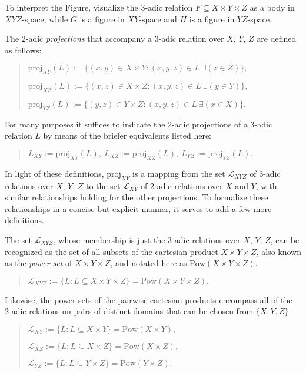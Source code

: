 \documentclass[12pt]{article}
\begin{document}
To interpret the Figure, visualize the 3-adic relation $F \subseteq X \times Y \times Z$ as a body in $XYZ$-space, while $G$ is a figure in $XY$-space and $H$ is a figure in $YZ$-space.

The 2-adic \textit{projections} that accompany a 3-adic relation over $X$, $Y$, $Z$ are defined as follows:

\begin{quote}
$\mathrm{proj}_{XY}(L) := \{ (x, y) \in X \times Y : (x, y, z) \in L\ \exists (z \in Z)\},$

$\mathrm{proj}_{XZ}(L) := \{ (x, z) \in X \times Z : (x, y, z) \in L\ \exists (y \in Y) \},$

$\mathrm{proj}_{YZ}(L) := \{ (y, z) \in Y \times Z : (x, y, z) \in L\ \exists (x \in X)\}.$
\end{quote}

For many purposes it suffices to indicate the 2-adic projections of a 3-adic relation $L$ by means of the briefer equivalents listed here:

\begin{quote}
$L_{XY} := \mathrm{proj}_{XY}(L),\ L_{XZ} := \mathrm{proj}_{XZ}(L),\ L_{YZ} := \mathrm{proj}_{YZ}(L).$
\end{quote}

In light of these definitions, $\mathrm{proj}_{XY}$ is a mapping from the set $\mathcal{L}_{XYZ}$ of 3-adic relations over $X$, $Y$, $Z$ to the set $\mathcal{L}_{XY}$ of 2-adic relations over $X$ and $Y$, with similar relationships holding for the other projections.  To formalize these relationships in a concise but explicit manner, it serves to add a few more definitions.

The set $\mathcal{L}_{XYZ}$, whose membership is just the 3-adic relations over $X$, $Y$, $Z$, can be recognized as the set of all subsets of the cartesian product $X \times Y \times Z$, also known as the \textit{power set} of $X \times Y \times Z$, and notated here as $\mathrm{Pow}(X \times Y \times Z)$.

\begin{quote}
$\mathcal{L}_{XYZ} := \{ L : L \subseteq X \times Y \times Z \} = \mathrm{Pow}(X \times Y \times Z).$
\end{quote}

Likewise, the power sets of the pairwise cartesian products encompass all of the 2-adic relations on pairs of distinct domains that can be chosen from $\{ X, Y, Z \}$.

\begin{quote}
$\mathcal{L}_{XY} := \{ L : L \subseteq X \times Y \} = \mathrm{Pow}(X \times Y),$

$\mathcal{L}_{XZ} := \{ L : L \subseteq X \times Z \} = \mathrm{Pow}(X \times Z),$

$\mathcal{L}_{YZ} := \{ L : L \subseteq Y \times Z \} = \mathrm{Pow}(Y \times Z).$
\end{quote}
\end{document}
